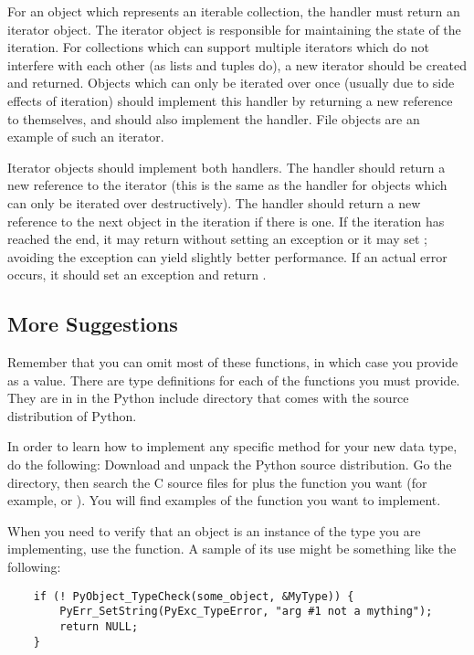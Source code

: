 For an object which represents an iterable collection, the
 handler must return an iterator object.  The iterator
object is responsible for maintaining the state of the iteration.  For
collections which can support multiple iterators which do not
interfere with each other (as lists and tuples do), a new iterator
should be created and returned.  Objects which can only be iterated
over once (usually due to side effects of iteration) should implement
this handler by returning a new reference to themselves, and should
also implement the  handler.  File objects are an
example of such an iterator.

Iterator objects should implement both handlers.  The 
handler should return a new reference to the iterator (this is the
same as the  handler for objects which can only be
iterated over destructively).  The  handler should
return a new reference to the next object in the iteration if there is
one.  If the iteration has reached the end, it may return \NULL{}
without setting an exception or it may set ;
avoiding the exception can yield slightly better performance.  If an
actual error occurs, it should set an exception and return \NULL.

\subsection{More Suggestions}

Remember that you can omit most of these functions, in which case you
provide  as a value.  There are type definitions for each of
the functions you must provide.  They are in  in the
Python include directory that comes with the source distribution of
Python.

In order to learn how to implement any specific method for your new
data type, do the following: Download and unpack the Python source
distribution.  Go the  directory, then search the
C source files for  plus the function you want (for
example,  or ).  You will find
examples of the function you want to implement.

When you need to verify that an object is an instance of the type
you are implementing, use the  function.
A sample of its use might be something like the following:

\begin{verbatim}
    if (! PyObject_TypeCheck(some_object, &MyType)) {
        PyErr_SetString(PyExc_TypeError, "arg #1 not a mything");
        return NULL;
    }
\end{verbatim}

